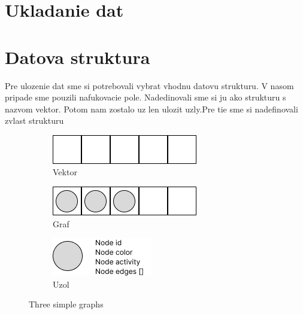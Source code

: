 \section{Ukladanie dat}

\section{Datova struktura}

Pre ulozenie dat sme si potrebovali vybrat vhodnu datovu strukturu. V nasom pripade sme pouzili nafukovacie pole.
Nadedinovali sme si ju ako strukturu s nazvom vektor. Potom nam zostalo uz len ulozit uzly.Pre tie sme si nadefinovali zvlast strukturu

\begin{figure}[h]
    \centering
    \begin{subfigure}[b]{0.3\textwidth}
        \centering
        \includegraphics[width=\textwidth]{doc/fig/vector.png}
        \caption{Vektor}
        \label{fig:vector}
    \end{subfigure}
    \hfill
    \begin{subfigure}[b]{0.3\textwidth}
        \centering
        \includegraphics[width=\textwidth]{doc/fig/graph.png}
        \caption{Graf}
        \label{fig:graph}
    \end{subfigure}
    \hfill
    \begin{subfigure}[b]{0.3\textwidth}
        \centering
        \includegraphics[width=\textwidth]{doc/fig/node.png}
        \caption{Uzol}
        \label{fig:five over x}
    \end{subfigure}
    \caption{Three simple graphs}
    \label{fig:three graphs}
\end{figure}


